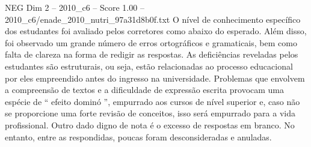 \begin{textsample}{NEG Dim 2 – 2010\_c6 – Score 1.00 – 2010\_c6/enade\_2010\_nutri\_97a31d8b0f.txt}
O nível de conhecimento específico dos estudantes foi avaliado pelos corretores como abaixo do esperado.
Além disso, foi observado um grande número de erros ortográficos e gramaticais, bem como falta de clareza na forma de redigir as respostas.
As deficiências reveladas pelos estudantes são estruturais, ou seja, estão relacionadas ao processo educacional por eles empreendido antes do ingresso na universidade.
Problemas que envolvem a compreensão de textos e a dificuldade de expressão escrita provocam uma espécie de “ efeito dominó ”, empurrado aos cursos de nível superior e, caso não se proporcione uma forte revisão de conceitos, isso será empurrado para a vida profissional.
Outro dado digno de nota é o excesso de respostas em branco.
No entanto, entre as respondidas, poucas foram desconsideradas e anuladas.

\end{textsample}
